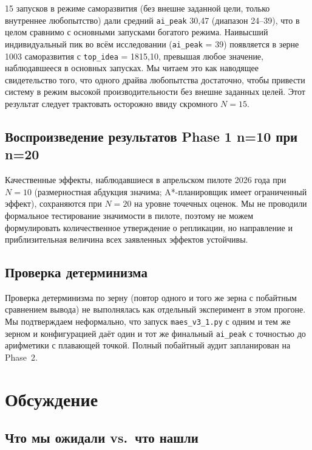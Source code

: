 \documentclass[11pt,a4paper]{article}
\begin{document}
15 запусков в режиме саморазвития (без внешне заданной цели,
только внутреннее любопытство) дали средний \texttt{ai\_peak}
30{,}47 (диапазон 24--39), что в целом сравнимо с основными
запусками богатого режима. Наивысший индивидуальный пик во
всём исследовании (\texttt{ai\_peak} = 39) появляется в зерне
1003 саморазвития с \texttt{top\_idea} = 1815{,}10, превышая
любое значение, наблюдавшееся в основных запусках. Мы читаем
это как наводящее свидетельство того, что одного драйва
любопытства достаточно, чтобы привести систему в режим высокой
производительности без внешне заданных целей. Этот результат
следует трактовать осторожно ввиду скромного $N=15$.

\subsection{Воспроизведение результатов Phase 1 n=10 при n=20}

Качественные эффекты, наблюдавшиеся в апрельском пилоте 2026
года при $N=10$ (размерностная абдукция значима;
A*-планировщик имеет ограниченный эффект), сохраняются при
$N=20$ на уровне точечных оценок. Мы не проводили формальное
тестирование значимости в пилоте, поэтому не можем
формулировать количественное утверждение о репликации, но
направление и приблизительная величина всех заявленных
эффектов устойчивы.

\subsection{Проверка детерминизма}

Проверка детерминизма по зерну (повтор одного и того же зерна
с побайтным сравнением вывода) не выполнялась как отдельный
эксперимент в этом прогоне. Мы подтверждаем неформально, что
запуск \texttt{maes\_v3\_1.py} с одним и тем же зерном и
конфигурацией даёт один и тот же финальный \texttt{ai\_peak}
с точностью до арифметики с плавающей точкой. Полный
побайтный аудит запланирован на Phase~2.


\section{Обсуждение}
\label{sec:discussion}

\subsection{Что мы ожидали vs.~что нашли}
\end{document}
